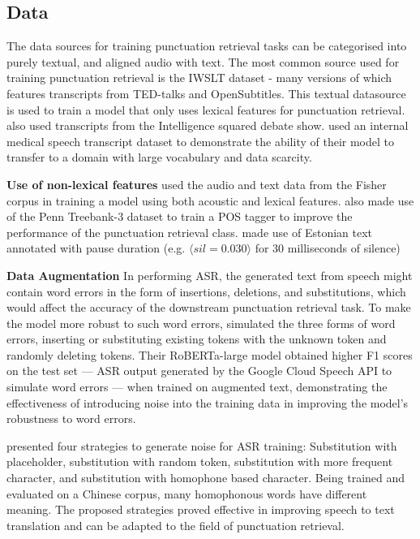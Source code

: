 \documentclass[a4paper]{article}
\begin{document}
\begin{multicols}{2}
\section{Data}
The data sources for training punctuation retrieval tasks can be categorised into purely textual, and aligned audio with text.
The most common source used for training punctuation retrieval is the IWSLT dataset - many versions of which features transcripts from TED-talks and OpenSubtitles. This textual datasource is used to train a model that only uses lexical features for punctuation retrieval. \cite{jointlearningcorrbirnn} also used transcripts from the Intelligence squared debate show. \cite{medicalasr} used an internal medical speech transcript dataset to demonstrate the ability of their model to transfer to a domain with large vocabulary and data scarcity.

\textbf{Use of non-lexical features} \cite{multimodalsemi} used the audio and text data from the Fisher corpus in training a model using both acoustic and lexical features. \cite{adversarial} also made use of the Penn Treebank-3 dataset to train a POS tagger to improve the performance of the punctuation retrieval class. \cite{birnnattention} made use of Estonian text annotated with pause duration (e.g. $\langle sil=0.030\rangle$ for 30 milliseconds of silence) 

\textbf{Data Augmentation} In performing ASR, the generated text from speech might contain word errors in the form of insertions, deletions, and substitutions, which would affect the accuracy of the downstream punctuation retrieval task. To make the model more robust to such word errors, \cite{noisy} simulated the three forms of word errors, inserting or substituting existing tokens with the unknown token and randomly deleting tokens. Their RoBERTa-large model obtained higher F1 scores on the test set --- ASR output generated by the Google Cloud Speech API to simulate word errors --- when trained on augmented text, demonstrating the effectiveness of introducing noise into the training data in improving the model's robustness to word errors. 

\cite{speechtranslationrobust} presented four strategies to generate noise for ASR training: Substitution with placeholder, substitution with random token, substitution with more frequent character, and substitution with homophone based character. Being trained and evaluated on a Chinese corpus, many homophonous words have different meaning. The proposed strategies proved effective in improving speech to text translation and can be adapted to the field of punctuation retrieval.


\end{multicols}
\end{document}
